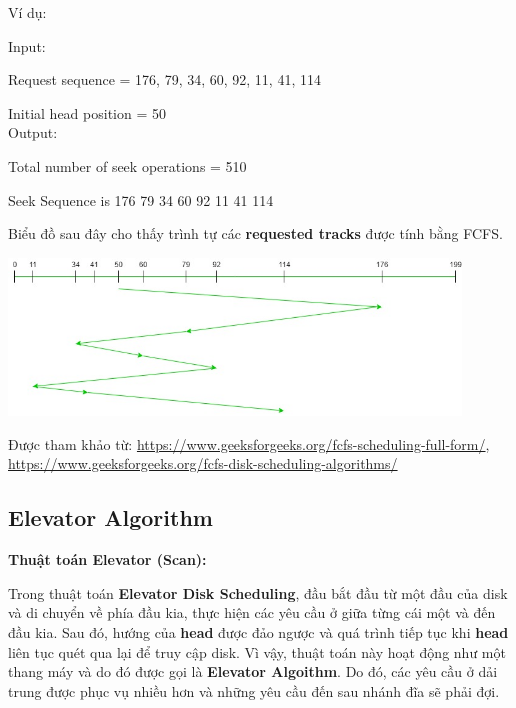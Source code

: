 \documentclass{report}
\begin{document}
    Ví dụ:

    \begin{tcolorbox}
    
        Input: 
        
        Request sequence = {176, 79, 34, 60, 92, 11, 41, 114}
        
        Initial head position = 50\\
        
        Output:
        
        Total number of seek operations = 510
        
        Seek Sequence is 176 79 34 60 92 11 41 114
        
    \end{tcolorbox} 

    Biểu đồ sau đây cho thấy trình tự các \textbf{requested tracks} được tính bằng FCFS. 

    \includegraphics[width = 12cm]{images/fcfs/fcfs-1.jpg}

    Được tham khảo từ: \href{https://www.geeksforgeeks.org/fcfs-scheduling-full-form/}{https://www.geeksforgeeks.org/fcfs-scheduling-full-form/},
    \href{https://www.geeksforgeeks.org/fcfs-disk-scheduling-algorithms/}{https://www.geeksforgeeks.org/fcfs-disk-scheduling-algorithms/}
        
    \subsection{Elevator Algorithm}

    \textbf{Thuật toán Elevator (Scan):}
    
    Trong thuật toán \textbf{Elevator Disk Scheduling}, đầu bắt đầu từ một đầu của disk và di chuyển về phía đầu kia, thực hiện các yêu cầu ở giữa từng cái một và đến đầu kia. Sau đó, hướng của \textbf{head} được đảo ngược và quá trình tiếp tục khi \textbf{head} liên tục quét qua lại để truy cập disk. Vì vậy, thuật toán này hoạt động như một thang máy và do đó được gọi là \textbf{Elevator Algoithm}. Do đó, các yêu cầu ở dải trung được phục vụ nhiều hơn và những yêu cầu đến sau nhánh đĩa sẽ phải đợi.
\end{document}
